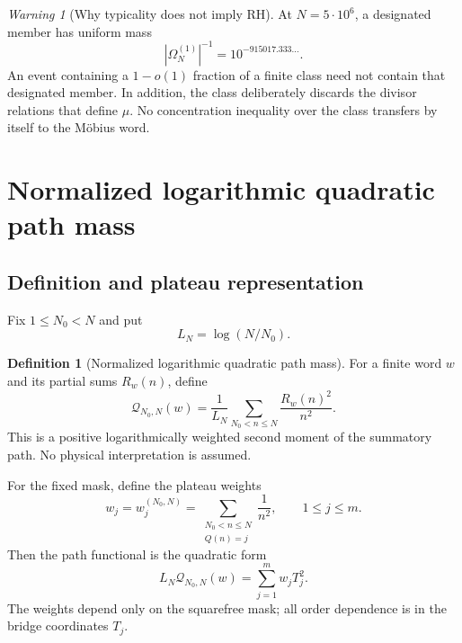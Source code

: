 \documentclass[11pt,reqno]{amsart}
\numberwithin{equation}{section}
\theoremstyle{plain}
\theoremstyle{definition}
\newtheorem{definition}[theorem]{Definition}
\theoremstyle{remark}
\newtheorem{warning}[theorem]{Warning}
\newcommand{\Om}{\Omega}
\newcommand{\QF}{\mathcal Q}
\begin{document}
\begin{warning}[Why typicality does not imply RH]
\label{warn:typicality-not-rh}
At \(N=5\cdot10^6\), a designated member has uniform mass
\begin{equation}
|\Om_N^{(1)}|^{-1}=10^{-915017.333\ldots}.
\label{eq:single-word-class-mass}
\end{equation}
An event containing a \(1-o(1)\) fraction of a finite class need not contain
that designated member.  In addition, the class deliberately discards the
divisor relations that define \(\mu\).  No concentration inequality over the
class transfers by itself to the M\"obius word.
\end{warning}

\section{Normalized logarithmic quadratic path mass}
\label{sec:quadratic-mass}

\subsection{Definition and plateau representation}
\label{subsec:quadratic-mass-definition}

Fix \(1\leq N_0<N\) and put
\begin{equation}
L_N=\log(N/N_0).
\label{eq:logarithmic-span}
\end{equation}

\begin{definition}[Normalized logarithmic quadratic path mass]
\label{def:quadratic-path-mass}
For a finite word \(w\) and its partial sums \(R_w(n)\), define
\begin{equation}
\QF_{N_0,N}(w)
=\frac{1}{L_N}\sum_{N_0<n\leq N}\frac{R_w(n)^2}{n^2}.
\label{eq:quadratic-path-mass}
\end{equation}
This is a positive logarithmically weighted second moment of the summatory
path.  No physical interpretation is assumed.
\end{definition}

For the fixed mask, define the plateau weights
\begin{equation}
w_j=w_j^{(N_0,N)}
=\sum_{\substack{N_0<n\leq N\\Q(n)=j}}\frac{1}{n^2},
\qquad 1\leq j\leq m.
\label{eq:plateau-weights}
\end{equation}
Then the path functional is the quadratic form
\begin{equation}
L_N\QF_{N_0,N}(w)=\sum_{j=1}^{m}w_jT_j^2.
\label{eq:plateau-quadratic-form}
\end{equation}
The weights depend only on the squarefree mask; all order dependence is in
the bridge coordinates \(T_j\).
\end{document}
